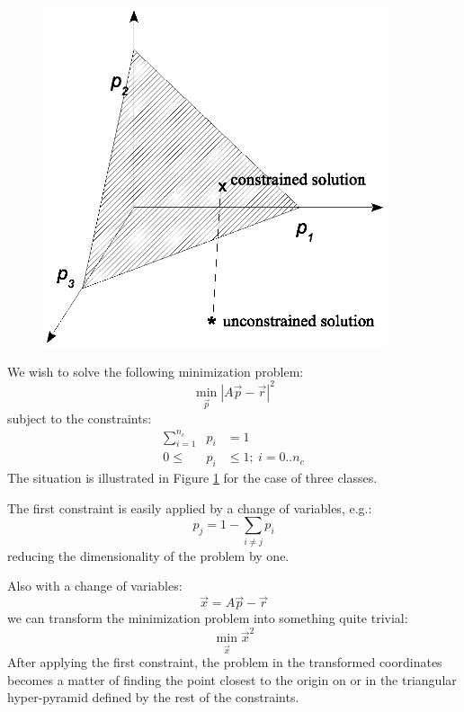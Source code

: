 \documentclass{article}
\begin{document}
\begin{figure}
\includegraphics[width=0.9\textwidth]{config1}
\label{fig1}
\end{figure}

We wish to solve the following minimization problem:
\begin{equation}
\underset{\vec p}{\min} |A \vec p - \vec r|^2
\label{basic_min}
\end{equation}
subject to the constraints:
\begin{eqnarray}
	\sum_{i=1}^{n_c} & p_i & = 1 \label{norm_constraint}\\
	0 \le & p_i & \le 1; ~i=0..n_c \label{prob_constraint}
\end{eqnarray}
The situation is illustrated in Figure \ref{fig1} for the case of three classes.

The first constraint is easily applied by a change of variables, e.g.:
\begin{equation}
p_j=1-\sum_{i \ne j} p_i
\label{changeofvariables}
\end{equation}
reducing the dimensionality of the problem by one. 

Also with a change of variables: 
\begin{equation}
\vec x = A \vec p - \vec r
\end{equation}
we can transform the minimization problem into
something quite trivial:
\begin{equation}
\underset{\vec x}{\min} {\vec x}^2
\label{trivial_min}
\end{equation}
After applying the first constraint, the problem in the transformed coordinates
becomes a matter of finding the point closest to the origin on or in the 
triangular hyper-pyramid defined by the rest of the constraints.
\end{document}
